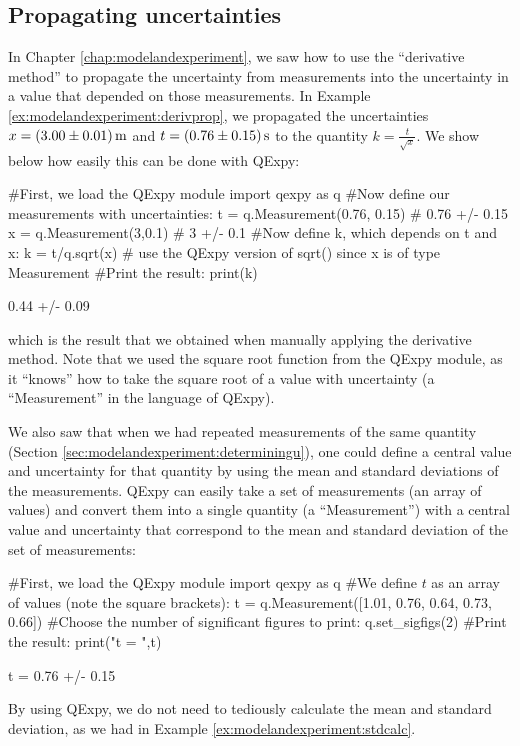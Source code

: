 \subsection{Propagating uncertainties}
In Chapter \ref{chap:modelandexperiment}, we saw how to use the ``derivative method'' to propagate the uncertainty from measurements into the uncertainty in a value that depended on those measurements. In Example \ref{ex:modelandexperiment:derivprop}, we propagated the uncertainties $x=\SI{3.00 \pm 0.01}{m}$ and $t=\SI{0.76\pm0.15}{s}$ to the quantity $k=\frac{t}{\sqrt x}$. We show below how easily this can be done with QExpy:

\begin{python}[caption=QExpy to propagate uncertainties] 
#First, we load the QExpy module
import qexpy as q
#Now define our measurements with uncertainties:
t = q.Measurement(0.76, 0.15) # 0.76 +/- 0.15
x = q.Measurement(3,0.1) # 3 +/- 0.1
#Now define k, which depends on t and x:
k = t/q.sqrt(x) # use the QExpy version of sqrt() since x is of type Measurement
#Print the result:
print(k)
\end{python}
\begin{poutput}
0.44 +/- 0.09
\end{poutput}
which is the result that we obtained when manually applying the derivative method. Note that we used the square root function from the QExpy module, as it ``knows'' how to take the square root of a value with uncertainty (a ``Measurement'' in the language of QExpy). 

We also saw that when we had repeated measurements of the same quantity (Section \ref{sec:modelandexperiment:determiningu}), one could define a central value and uncertainty for that quantity by using the mean and standard deviations of the measurements. QExpy can easily take a set of measurements (an array of values) and convert them into a single quantity (a ``Measurement'') with a central value and uncertainty that correspond to the mean and standard deviation of the set of measurements:

\begin{python}[caption=QExpy to calculate mean and standard deviation] 
#First, we load the QExpy module
import qexpy as q
#We define $t$ as an array of values (note the square brackets):
t = q.Measurement([1.01,  0.76,  0.64,  0.73,  0.66])
#Choose the number of significant figures to print:
q.set_sigfigs(2)
#Print the result:
print("t = ",t)
\end{python}
\begin{poutput}
t = 0.76 +/- 0.15
\end{poutput}
By using QExpy, we do not need to tediously calculate the mean and standard deviation, as we had in Example \ref{ex:modelandexperiment:stdcalc}.


